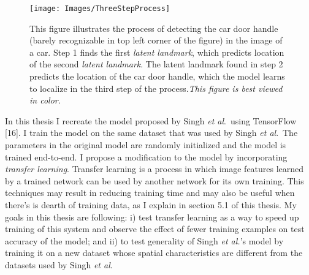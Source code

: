 \documentclass [11pt,letterpaper ,twoside ,openany ]{report}
\begin{document}
    \begin{wrapfigure}{l}[9mm]{0.5\textwidth}
        \begin{center}
            \texttt{[image: Images/ThreeStepProcess]}
        \end{center}
        \caption{This figure illustrates the process of detecting the car door handle (barely recognizable in top left corner of the figure) in the image of a car. Step 1 finds the first \textit{latent landmark}, which predicts location of the second \textit{latent landmark}. The latent landmark found in step 2 predicts the location of the car door handle, which the model learns to localize in the third step of the process.\textit{This figure is best viewed in color.}}
    \end{wrapfigure}            

    In this thesis I recreate the model proposed by Singh \textit{et al}.\ using TensorFlow [16]. I train the model on the same dataset that was used by Singh \textit{et al}.\ The parameters in the original model are randomly initialized and the model is trained end-to-end. I propose a modification to the model by incorporating \textit {transfer learning}. Transfer learning is a process in which image features learned by a trained network can be used by another network for its own training. This techniques may result in reducing training time and may also be useful when there's is dearth of training data, as I explain in section 5.1 of this thesis. My goals in this thesis are following: i) test transfer learning as a way to speed up training of this system and observe the effect of fewer training examples on test accuracy of the model; and ii) to test generality of Singh \textit{et al.}'s model by training it on a new dataset whose spatial characteristics are different from the datasets used by Singh \textit{et al}.\
\end{document}
